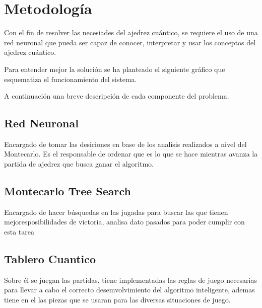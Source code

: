\section{Metodología}
Con el fin de resolver las necesiades del ajedrez cuántico, se requiere el uso de una
red neuronal que pueda ser capaz de conocer, interpretar y usar los 
conceptos del ajedrez cuántico.

Para entender mejor la solución se ha 
planteado el siguiente gráfico que esquematiza 
el funcionamiento del sistema.


A continuación una breve descripción de cada componente del problema.

\subsection{Red Neuronal}
Encargado de tomar las desiciones en base de los 
analisis realizados a nivel del Montecarlo. Es el 
responsable de ordenar que es lo que se hace mientras 
avanza la partida de ajedrez que busca ganar el algoritmo.
\subsection{Montecarlo Tree Search}
Encargado de hacer búsquedas en las jugadas para 
buscar las que tienen mejoresposibilidades de victoria, 
analisa dato pasados para poder cumplir con esta tarea
\subsection{Tablero Cuantico}
Sobre él se juegan las partidas, tiene implementadas las reglas de juego
necesarias para llevar a cabo el correcto desemvolvimiento del algoritmo inteligente,
ademas tiene en el las piezas que se usaran para las diversas situaciones de juego.

